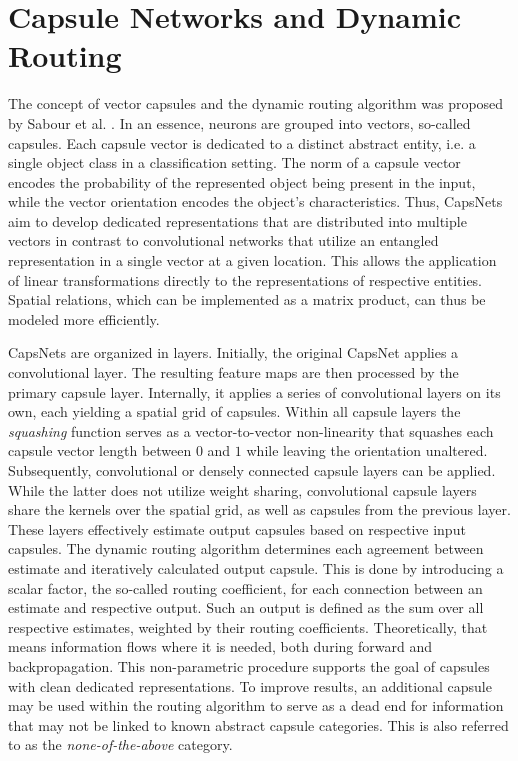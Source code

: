 \documentclass{article}
\begin{document}
\section{Capsule Networks and Dynamic Routing}
\label{lab:capsules}
The concept of vector capsules and the dynamic routing algorithm was proposed by Sabour et al. . In an essence, neurons are grouped into vectors, so-called capsules. Each capsule vector is dedicated to a distinct abstract entity, i.e. a single object class in a classification setting. The norm of a capsule vector encodes the probability of the represented object being present in the input, while the vector orientation encodes the object's characteristics. Thus, CapsNets aim to develop dedicated representations that are distributed into multiple vectors in contrast to convolutional networks that utilize an entangled representation in a single vector at a given location. This allows the application of linear transformations directly to the representations of respective entities. Spatial relations, which can be implemented as a matrix product, can thus be modeled more efficiently.

CapsNets are organized in layers. Initially, the original CapsNet applies a convolutional layer. The resulting feature maps are then processed by the primary capsule layer. Internally, it applies a series of convolutional layers on its own, each yielding a spatial grid of capsules. Within all capsule layers the \textit{squashing} function serves as a vector-to-vector non-linearity that squashes each capsule vector length between $0$ and $1$ while leaving the orientation unaltered. Subsequently, convolutional or densely connected capsule layers can be applied. While the latter does not utilize weight sharing, convolutional capsule layers share the kernels over the spatial grid, as well as capsules from the previous layer. These layers effectively estimate output capsules based on respective input capsules. The dynamic routing algorithm determines each agreement between estimate and iteratively calculated output capsule. This is done by introducing a scalar factor, the so-called routing coefficient, for each connection between an estimate and respective output. Such an output is defined as the sum over all respective estimates, weighted by their routing coefficients. Theoretically, that means information flows where it is needed, both during forward and backpropagation. This non-parametric procedure supports the goal of capsules with clean dedicated representations. To improve results, an additional capsule may be used within the routing algorithm to serve as a dead end for information that may not be linked to known abstract capsule categories. This is also referred to as the \emph{none-of-the-above} category.
\end{document}
